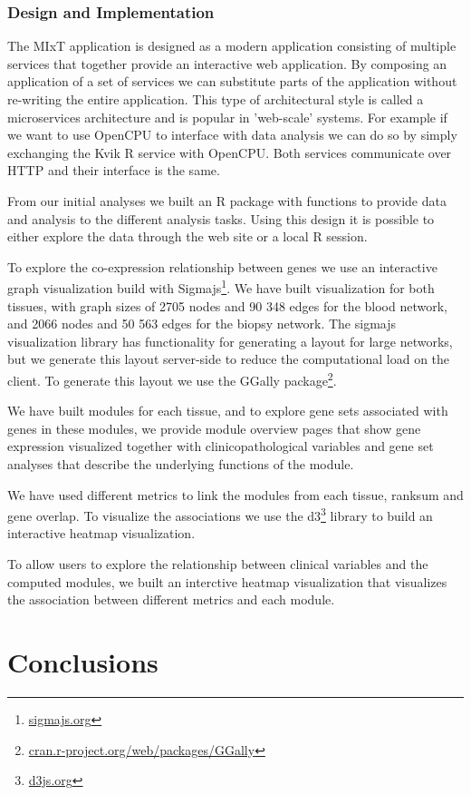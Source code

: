 \subsubsection*{Design and Implementation}
The MIxT application is designed as a modern application consisting of multiple
services that together provide an interactive web application. By composing an
application of a set of services we can substitute parts of the application
without re-writing the entire application. This type of architectural style is
called a microservices architecture and is popular in 'web-scale' systems. For
example if we want to use OpenCPU to interface with data analysis we can do so
by simply exchanging the Kvik R service with OpenCPU. Both services communicate
over HTTP and their interface is the same. 

From our initial analyses we built
an R package with functions to provide data and analysis to the different
analysis tasks. Using this design it is possible to either explore the data
through the web site or a local R session. 

To explore the co-expression relationship between genes we use an interactive
graph visualization build with Sigmajs\footnote{\url{sigmajs.org}}. We have
built visualization for both tissues, with graph sizes of 2705 nodes and 90 348
edges for the blood network, and 2066 nodes and 50 563 edges for the biopsy
network. The sigmajs visualization library has functionality for generating a
layout for large networks, but we generate this layout server-side to reduce the
computational load on the client. To generate this layout we use the GGally
package\footnote{\url{cran.r-project.org/web/packages/GGally}}. 

We have built modules for each tissue, and to explore gene sets associated with
genes in these modules, we provide module overview pages that show gene
expression visualized together with clinicopathological variables and gene set
analyses that describe the underlying functions of the module. 

We have used different metrics to link the modules from each tissue, ranksum and
gene overlap. To visualize the associations we use the
d3\footnote{\url{d3js.org}} library to build an interactive heatmap
visualization. 

To allow users to explore the relationship between clinical variables and the
computed modules, we built an interctive heatmap visualization that visualizes
the association between different metrics and each module. 



\section*{Conclusions}
